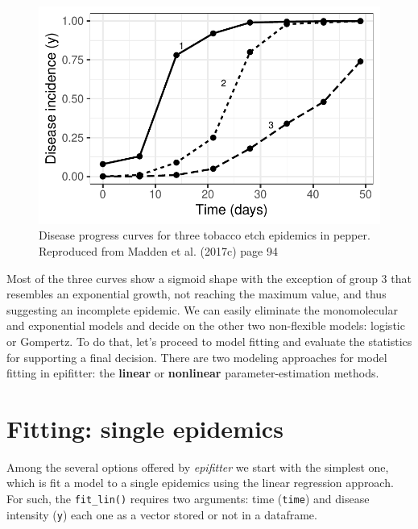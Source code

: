 \documentclass[
  letterpaper,
  DIV=11,
  numbers=noendperiod]{scrreprt}
\begin{document}
\begin{figure}[H]

{\centering \includegraphics{temporal-fitting_files/figure-pdf/fig-dpcs-1.pdf}

}

\caption{\label{fig-dpcs}Disease progress curves for three tobacco etch
epidemics in pepper. Reproduced from Madden et al. (2017c) page 94}

\end{figure}

Most of the three curves show a sigmoid shape with the exception of
group 3 that resembles an exponential growth, not reaching the maximum
value, and thus suggesting an incomplete epidemic. We can easily
eliminate the monomolecular and exponential models and decide on the
other two non-flexible models: logistic or Gompertz. To do that, let's
proceed to model fitting and evaluate the statistics for supporting a
final decision. There are two modeling approaches for model fitting in
epifitter: the \textbf{linear} or \textbf{nonlinear}
parameter-estimation methods.

\hypertarget{fitting-single-epidemics}{%
\section{Fitting: single epidemics}\label{fitting-single-epidemics}}

Among the several options offered by \emph{epifitter} we start with the
simplest one, which is fit a model to a single epidemics using the
linear regression approach. For such, the \texttt{fit\_lin()} requires
two arguments: time (\texttt{time}) and disease intensity (\texttt{y})
each one as a vector stored or not in a dataframe.
\end{document}
